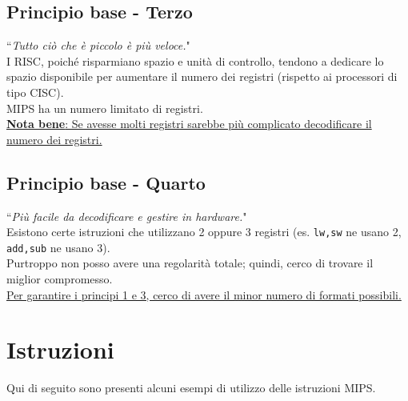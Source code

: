 \documentclass[../main.tex]{subfiles}
\begin{document}
\subsection*{Principio base - \Large Terzo}
``\textit{Tutto ciò che è piccolo è più veloce.}"
\\[2mm] I RISC, poiché risparmiano spazio e unità di controllo, tendono a
dedicare lo spazio disponibile per aumentare il numero dei registri
(rispetto ai processori di tipo CISC).
\\ MIPS ha un numero limitato di registri.
\\[3mm]
\underline{\textbf{Nota bene}: Se avesse molti registri sarebbe più complicato decodificare il numero
dei registri.}

\subsection*{Principio base - \Large Quarto}
``\textit{Più facile da decodificare e gestire in hardware.}"
\\[2mm] Esistono certe istruzioni che utilizzano 2 oppure 3 registri (es. \texttt{lw,sw} ne usano 2, \texttt{add,sub} ne usano 3).
\\ Purtroppo non posso avere una regolarità totale; quindi, cerco di trovare il miglior compromesso.
\\[3mm]
\underline{Per garantire i principi 1 e 3, cerco di avere il minor numero di formati possibili.}

\newpage

\section{Istruzioni}
Qui di seguito sono presenti alcuni esempi
di utilizzo delle istruzioni MIPS.
\end{document}
